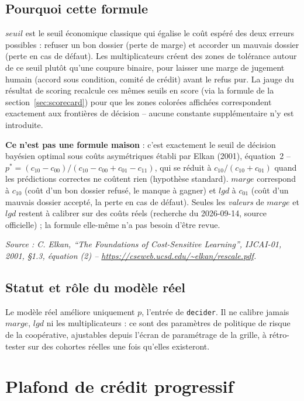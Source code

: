 \documentclass[11pt,a4paper]{article}
\begin{document}
\subsection*{Pourquoi cette formule}
$\mathit{seuil}$ est le seuil économique classique qui égalise le coût espéré des deux erreurs
possibles : refuser un bon dossier (perte de marge) et accorder un mauvais dossier (perte en cas
de défaut). Les multiplicateurs créent des zones de tolérance autour de ce seuil plutôt qu'une
coupure binaire, pour laisser une marge de jugement humain (accord sous condition, comité de
crédit) avant le refus pur. La jauge du résultat de scoring recalcule ces mêmes seuils en score
(via la formule de la section~\ref{sec:scorecard}) pour que les zones colorées affichées
correspondent exactement aux frontières de décision -- aucune constante supplémentaire n'y est
introduite.

\textbf{Ce n'est pas une formule maison} : c'est exactement le seuil de décision bayésien optimal
sous coûts asymétriques établi par Elkan (2001), équation~2 -- $p^{*} = (c_{10}-c_{00}) /
(c_{10}-c_{00}+c_{01}-c_{11})$, qui se réduit à $c_{10}/(c_{10}+c_{01})$ quand les prédictions
correctes ne coûtent rien (hypothèse standard). $\mathit{marge}$ correspond à $c_{10}$ (coût
d'un bon dossier refusé, le manque à gagner) et $\mathit{lgd}$ à $c_{01}$ (coût d'un mauvais
dossier accepté, la perte en cas de défaut). Seules les \emph{valeurs} de $\mathit{marge}$ et
$\mathit{lgd}$ restent à calibrer sur des coûts réels (recherche du 2026-09-14, source
officielle) ; la formule elle-même n'a pas besoin d'être revue.

\textit{Source : C. Elkan, ``The Foundations of Cost-Sensitive Learning'', IJCAI-01, 2001,
\S1.3, équation (2) --
\url{https://cseweb.ucsd.edu/~elkan/rescale.pdf}.}

\subsection*{Statut et rôle du modèle réel}
Le modèle réel améliore uniquement $p$, l'entrée de \texttt{decider}. Il ne calibre jamais
$\mathit{marge}$, $\mathit{lgd}$ ni les multiplicateurs : ce sont des paramètres de politique de
risque de la coopérative, ajustables depuis l'écran de paramétrage de la grille, à rétro-tester
sur des cohortes réelles une fois qu'elles existeront.

\newpage

\section{Plafond de crédit progressif}
\label{sec:progressif}
\end{document}

